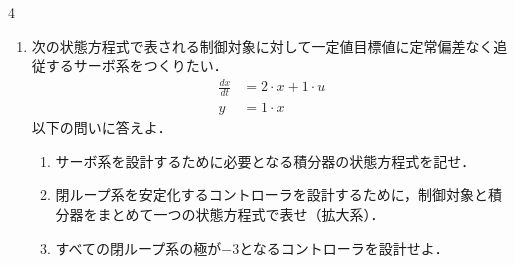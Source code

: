 \documentclass[fleqn]{article}
\begin{document}
\begin{multicols}{4}
\begin{enumerate}





\item
次の状態方程式で表される制御対象に対して一定値目標値に定常偏差なく追従するサーボ系をつくりたい．
\begin{align*}
	\frac{dx}{dt} & = 2 \cdot x + 1 \cdot u \\
	y &= 1 \cdot x
\end{align*}
以下の問いに答えよ．
\begin{enumerate}
\item
サーボ系を設計するために必要となる積分器の状態方程式を記せ．
\vspace{4cm}

\item
閉ループ系を安定化するコントローラを設計するために，制御対象と積分器をまとめて一つの状態方程式で表せ（拡大系）．
\vspace{6cm}

\item
すべての閉ループ系の極が$-3$となるコントローラを設計せよ．
\vspace{9cm}

\end{enumerate}

\vfill\null
\columnbreak













\end{enumerate}
\end{multicols}
\end{document}
